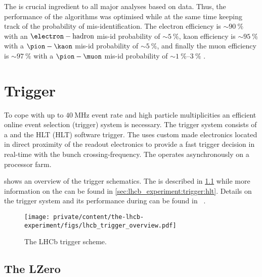 The \PID is crucial ingredient to all major analyses based on \LHCb data. Thus,
the performance of the \PID algorithms was optimised while at the same time
keeping track of the probability of mis-identification. The electron \PID
efficiency is $\sim\SI{90}{\percent}$ with an $\electron-\text{hadron}$ mis-id
probability of $\sim\SI{5}{\percent}$, kaon \PID efficiency is
$\sim\SI{95}{\percent}$ with a $\pion-\kaon$ mis-id probability of
$\sim\SI{5}{\percent}$, and finally the muon \PID efficiency is
$\sim\SI{97}{\percent}$ with a $\pion-\muon$ mis-id probability of
$\sim\SIrange[range-phrase = -,range-units = single]{1}{3}{\percent}$
\cite{Aaij:2014jba,Archilli:2013npa}.

\section{Trigger}
\label{sec:lhcb_experiment:trigger}

To cope with up to $\SI{40}{\mega\hertz}$ event rate and high particle
multiplicities an efficient online event selection (trigger) system is
necessary. The \LHCb trigger system consists of a \LZero and the \acs{HLT}
(\acl{HLT}) software trigger. The \LZero uses custom made electronics located in
direct proximity of the readout electronics to provide a fast trigger decision
in real-time with the bunch crossing-frequency. The \HLT operates asynchronously
on a processor farm.

 shows an overview of the \LHCb
trigger schematics. The \LZero is described in
\cref{sec:lhcb_experiment:trigger:lzero} while more information on the \HLT can
be found in \cref{sec:lhcb_experiment:trigger:hlt}. Details on the \LHCb trigger
system and its performance during \RunOne can be found in
\Refs~\cite{Aaij:2012me,Albrecht:2013fba}.
%
\begin{figure}[t]
  \centering
  \texttt{[image: private/content/the-lhcb-experiment/figs/lhcb\_trigger\_overview.pdf]}
  \caption{
    The \acs{LHCb} \RunOne trigger scheme.
  }
  \label{fig:lhcb_experiment:trigger:overview}
\end{figure}

\subsection{The \acl*{LZero}}
\label{sec:lhcb_experiment:trigger:lzero}

